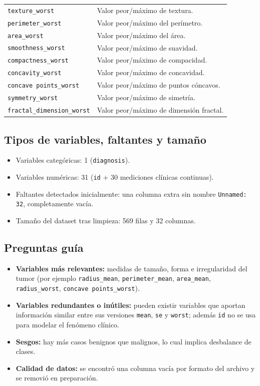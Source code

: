 \begin{longtable}{p{} p{}}
\texttt{texture\_worst} & Valor peor/máximo de textura. \\
\texttt{perimeter\_worst} & Valor peor/máximo del perímetro. \\
\texttt{area\_worst} & Valor peor/máximo del área. \\
\texttt{smoothness\_worst} & Valor peor/máximo de suavidad. \\
\texttt{compactness\_worst} & Valor peor/máximo de compacidad. \\
\texttt{concavity\_worst} & Valor peor/máximo de concavidad. \\
\texttt{concave points\_worst} & Valor peor/máximo de puntos cóncavos. \\
\texttt{symmetry\_worst} & Valor peor/máximo de simetría. \\
\texttt{fractal\_dimension\_worst} & Valor peor/máximo de dimensión fractal. \\
\bottomrule
\end{longtable}

\subsection{Tipos de variables, faltantes y tamaño}
\begin{itemize}
    \item Variables categóricas: 1 (\texttt{diagnosis}).
    \item Variables numéricas: 31 (\texttt{id} + 30 mediciones clínicas continuas).
    \item Faltantes detectados inicialmente: una columna extra sin nombre \texttt{Unnamed: 32}, completamente vacía.
    \item Tamaño del dataset tras limpieza: 569 filas y 32 columnas.
\end{itemize}

\subsection{Preguntas guía}
\begin{itemize}
    \item \textbf{Variables más relevantes:} medidas de tamaño, forma e irregularidad del tumor (por ejemplo \texttt{radius\_mean}, \texttt{perimeter\_mean}, \texttt{area\_mean}, \texttt{radius\_worst}, \texttt{concave points\_worst}).
    \item \textbf{Variables redundantes o inútiles:} pueden existir variables que aportan información similar entre sus versiones \texttt{mean}, \texttt{se} y \texttt{worst}; además \texttt{id} no se usa para modelar el fenómeno clínico.
    \item \textbf{Sesgos:} hay más casos benignos que malignos, lo cual implica desbalance de clases.
    \item \textbf{Calidad de datos:} se encontró una columna vacía por formato del archivo y se removió en preparación.
\end{itemize}
